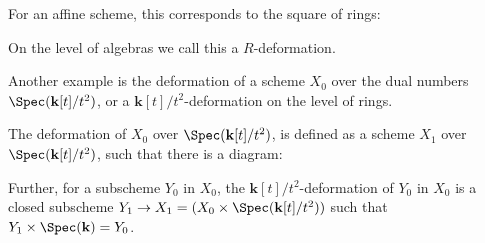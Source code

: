     \begin{ex} 
    For an affine scheme, this corresponds to the square of rings:
    \begin{center}
    \end{center}
    On the level of algebras we call this a \(R\)-deformation.    
    \end{ex} 
    Another example is the deformation of a scheme \(X_0 \) over the dual numbers \( \Spec(\mathbf{k}[t]/t^2)\),
    or a \( \mathbf{k}[t]/t^2\)-deformation on the level of rings.
    
    \begin{ex} 
    \label{ex:def_dual}
    The deformation of \(X_0\) over \( \Spec(\mathbf{k}[t]/t^2)\), is defined as a scheme \(X_{1}\) over \( \Spec(\mathbf{k}[t]/t^2)\), such that there is a diagram:
    \begin{center} 
    \end{center}
    Further, for a subscheme \(Y_0\) in \(X_0\), the \( \mathbf{k}[t]/t^2\)-deformation of \(Y_0\) in \(X_0\) is a closed subscheme  \(Y_{1} \rightarrow X_{1} =  (X_0 \times \Spec(\mathbf{k}[t]/t^2)) \) such that \( Y_{1} \times \Spec(\mathbf{k}) = Y_0\). 
    \end{ex}
    

